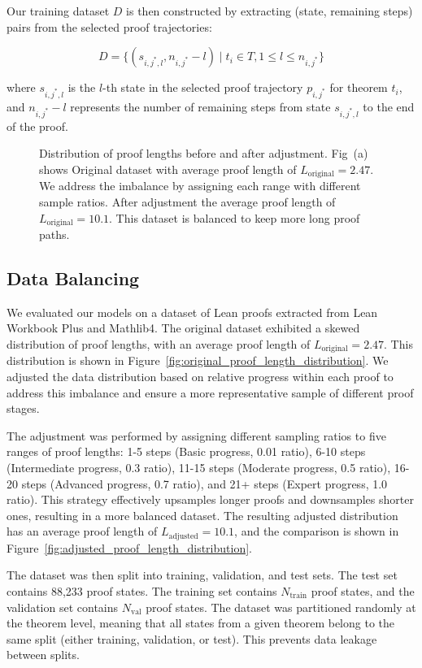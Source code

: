 Our training dataset $D$ is then constructed by extracting (state, remaining steps) pairs from the selected proof trajectories:

\[
D = \{(s_{i,j^*,l}, n_{i,j^*} - l) \mid t_i \in T, 1 \le l \le n_{i,j^*}\}
\]

where $s_{i,j^*,l}$ is the $l$-th state in the selected proof trajectory $p_{i,j^*}$ for theorem $t_i$, and $n_{i,j^*} - l$ represents the number of remaining steps from state $s_{i,j^*,l}$ to the end of the proof.

\begin{figure*}[t]
\centering
    \caption{Distribution of proof lengths before and after adjustment. Fig~(a) shows Original dataset with average proof length of $L_{\text{original}} = 2.47$. We address the imbalance by assigning each range with different sample ratios. After adjustment the average proof length of $L_{\text{original}} = 10.1$. This dataset is balanced to keep more long proof paths.} 
\end{figure*}

\subsection{Data Balancing}

We evaluated our models on a dataset of Lean proofs extracted from Lean Workbook Plus and Mathlib4. The original dataset exhibited a skewed distribution of proof lengths, with an average proof length of $L_{\text{original}} = 2.47$. This distribution is shown in Figure~\ref{fig:original_proof_length_distribution}. We adjusted the data distribution based on relative progress within each proof to address this imbalance and ensure a more representative sample of different proof stages.

The adjustment was performed by assigning different sampling ratios to five ranges of proof lengths: 1-5 steps (Basic progress, 0.01 ratio), 6-10 steps (Intermediate progress, 0.3 ratio), 11-15 steps (Moderate progress, 0.5 ratio), 16-20 steps (Advanced progress, 0.7 ratio), and 21+ steps (Expert progress, 1.0 ratio). This strategy effectively upsamples longer proofs and downsamples shorter ones, resulting in a more balanced dataset. The resulting adjusted distribution has an average proof length of $L_{\text{adjusted}} = 10.1$, and the comparison is shown in Figure~\ref{fig:adjusted_proof_length_distribution}.

The dataset was then split into training, validation, and test sets. The test set contains 88,233 proof states. The training set contains $N_{\text{train}}$ proof states, and the validation set contains $N_{\text{val}}$ proof states. The dataset was partitioned randomly at the theorem level, meaning that all states from a given theorem belong to the same split (either training, validation, or test). This prevents data leakage between splits.
